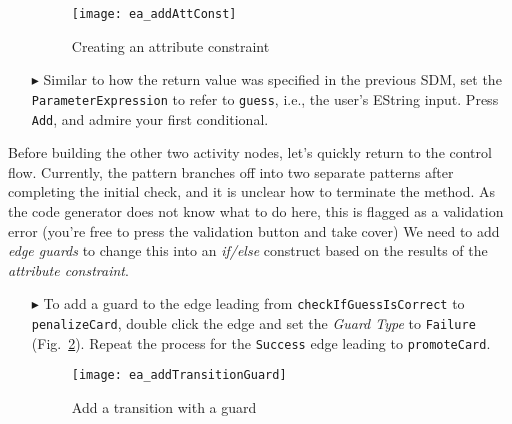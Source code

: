 \begin{itemize}
\vspace{0.5cm}

\begin{figure}[htbp]
\begin{center}
  \texttt{[image: ea\_addAttConst]}
  \caption{Creating an attribute constraint}
  \label{ea:sdmcheck_att_constraint}
\end{center}
\end{figure}

\item[$\blacktriangleright$] Similar to how the return value was specified in the previous SDM, set the \texttt{ParameterExpression} to refer to \texttt{guess},
i.e., the user's EString input. Press \texttt{Add}, and admire your first conditional.

\end{itemize}

Before building the other two activity nodes, let's quickly return to the control flow. Currently, the pattern branches off into two separate patterns after
completing the initial check, and it is unclear how to terminate the method. As the code generator does not know what to do here, this is flagged as a
validation error (you're free to press the validation button and take cover) We need to add \emph{edge guards} to change this into an
\emph{if/else} construct based on the results of the \emph{attribute constraint}.

\newpage
\begin{itemize}

\item[$\blacktriangleright$] To add a guard to the edge leading from \texttt{check\-If\-Guess\-Is\-Correct} to \texttt{penalize\-Card}, double click the edge
and set the \emph{Guard Type} to \texttt{Failure} (Fig.~\ref{ea:sdm_check_guard}). Repeat the process for the \texttt{Success} edge leading to
\texttt{promoteCard}.

\vspace{0.5cm}

\begin{figure}[htbp]
\begin{center}
  \texttt{[image: ea\_addTransitionGuard]}
  \caption{Add a transition with a guard}
  \label{ea:sdm_check_guard}
\end{center}
\end{figure}

\vspace{0.5cm}

\end{itemize}

